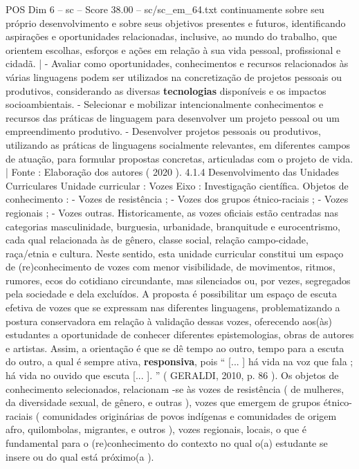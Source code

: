\begin{textsample}{POS Dim 6 – sc – Score 38.00 – sc/sc\_em\_64.txt}
continuamente sobre seu próprio desenvolvimento e sobre seus objetivos presentes e futuros, identificando aspirações e oportunidades relacionadas, inclusive, ao mundo do trabalho, que orientem escolhas, esforços e ações em relação à sua vida pessoal, profissional e cidadã. | - Avaliar como oportunidades, conhecimentos e recursos relacionados às várias linguagens podem ser utilizados na concretização de projetos pessoais ou produtivos, considerando as diversas \textbf{tecnologias} disponíveis e os impactos socioambientais. - Selecionar e mobilizar intencionalmente conhecimentos e recursos das práticas de linguagem para desenvolver um projeto pessoal ou um empreendimento produtivo. - Desenvolver projetos pessoais ou produtivos, utilizando as práticas de linguagens socialmente relevantes, em diferentes campos de atuação, para formular propostas concretas, articuladas com o projeto de vida. | Fonte : Elaboração dos autores ( 2020 ). 4.1.4 Desenvolvimento das Unidades Curriculares Unidade curricular : Vozes Eixo : Investigação científica.
Objetos de conhecimento : - Vozes de resistência ; - Vozes dos grupos étnico-raciais ; - Vozes regionais ; - Vozes outras.
Historicamente, as vozes oficiais estão centradas nas categorias masculinidade, burguesia, urbanidade, branquitude e eurocentrismo, cada qual relacionada às de gênero, classe social, relação campo-cidade, raça/etnia e cultura.
Neste sentido, esta unidade curricular constitui um espaço de (re)conhecimento de vozes com menor visibilidade, de movimentos, ritmos, rumores, ecos do cotidiano circundante, mas silenciados ou, por vezes, segregados pela sociedade e dela excluídos.
A proposta é possibilitar um espaço de escuta efetiva de vozes que se expressam nas diferentes linguagens, problematizando a postura conservadora em relação à validação dessas vozes, oferecendo aos(às) estudantes a oportunidade de conhecer diferentes epistemologias, obras de autores e artistas.
Assim, a orientação é que se dê tempo ao outro, tempo para a escuta do outro, a qual é sempre ativa, \textbf{responsiva}, pois “ [... ] há vida na voz que fala ; há vida no ouvido que escuta [... ]. ” ( GERALDI, 2010, p. 86 ).
Os objetos de conhecimento selecionados, relacionam -se às vozes de resistência ( de mulheres, da diversidade sexual, de gênero, e outras ), vozes que emergem de grupos étnico-raciais ( comunidades originárias de povos indígenas e comunidades de origem afro, quilombolas, migrantes, e outros ), vozes regionais, locais, o que é fundamental para o (re)conhecimento do contexto no qual o(a) estudante se insere ou do qual está próximo(a ).

\end{textsample}
